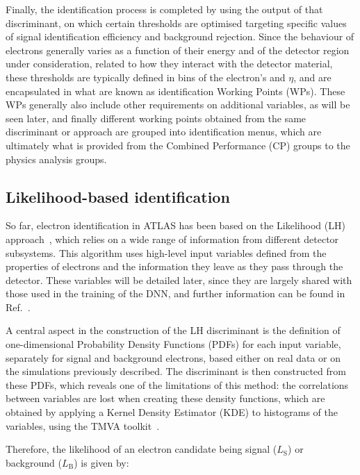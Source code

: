 Finally, the identification process is completed by using the output of that discriminant, on which certain thresholds are optimised targeting specific values of signal identification efficiency and background rejection. Since the behaviour of electrons generally varies as a function of their energy and of the detector region under consideration, related to how they interact with the detector material, these thresholds are typically defined in bins of the electron’s \pt and $\eta$, and are encapsulated in what are known as identification Working Points (WPs). These WPs generally also include other requirements on additional variables, as will be seen later, and finally different working points obtained from the same discriminant or approach are grouped into identification menus, which are ultimately what is provided from the Combined Performance (CP) groups to the physics analysis groups.

\subsection{Likelihood-based identification}

So far, electron identification in ATLAS has been based on the Likelihood (LH) approach~\cite{Aad:2684552,Aaboud:2657964}, which relies on a wide range of information from different detector subsystems. This algorithm uses high-level input variables defined from the properties of electrons and the information they leave as they pass through the detector. These variables will be detailed later, since they are largely shared with those used in the training of the DNN, and further information can be found in Ref.~\cite{Aaboud:2657964}.

A central aspect in the construction of the LH discriminant is the definition of one-dimensional Probability Density Functions (PDFs) for each input variable, separately for signal and background electrons, based either on real data or on the simulations previously described.
The discriminant is then constructed from these PDFs, which reveals one of the limitations of this method: the correlations between variables are lost when creating these density functions, which are obtained by applying a Kernel Density Estimator (KDE) to histograms of the variables, using the TMVA toolkit~\cite{tmvatoolkit}. 

Therefore, the likelihood of an electron candidate being signal ($L_{\text{S}}$) or background ($L_{\text{B}}$) is given by:


